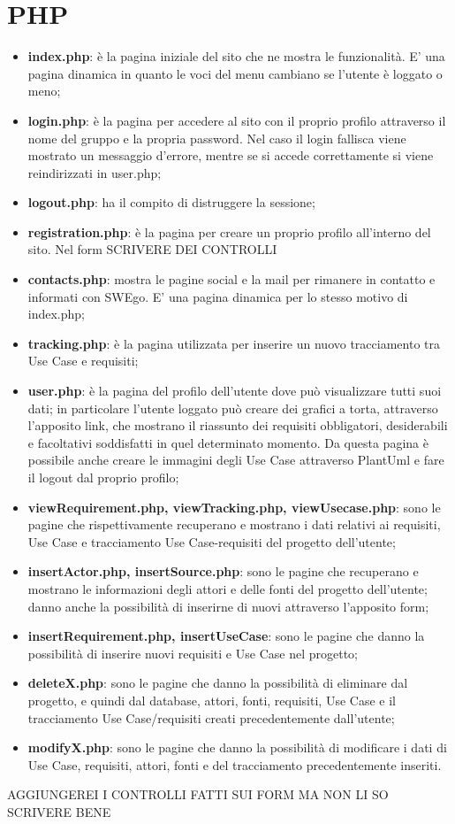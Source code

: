 \section{PHP}

\begin{itemize}
	\item \textbf{index.php}: è la pagina iniziale del sito che ne mostra le funzionalità. E' una pagina dinamica in quanto le voci del menu cambiano se l'utente è loggato o meno;
	\item \textbf{login.php}: è la pagina per accedere al sito con il proprio profilo attraverso il nome del gruppo e la propria password. Nel caso il login fallisca viene mostrato un messaggio d'errore, mentre se si accede correttamente si viene reindirizzati in user.php;
	\item \textbf{logout.php}: ha il compito di distruggere la sessione;
	\item \textbf{registration.php}: è la pagina per creare un proprio profilo all'interno del sito. Nel form SCRIVERE DEI CONTROLLI
	\item \textbf{contacts.php}: mostra le pagine social e la mail per rimanere in contatto e informati con SWEgo. E' una pagina dinamica per lo stesso motivo di index.php;
	\item \textbf{tracking.php}: è la pagina utilizzata per inserire un nuovo tracciamento tra Use Case e requisiti;
	\item \textbf{user.php}: è la pagina del profilo dell'utente dove può visualizzare tutti suoi dati; in particolare l'utente loggato può creare dei grafici a torta, attraverso l'apposito link, che mostrano il riassunto dei requisiti obbligatori, desiderabili e facoltativi soddisfatti in quel determinato momento. Da questa pagina è possibile anche creare le immagini degli Use Case attraverso PlantUml e fare il logout dal proprio profilo;
	\item \textbf{viewRequirement.php, viewTracking.php, viewUsecase.php}: sono le pagine che rispettivamente recuperano e mostrano i dati relativi ai requisiti, Use Case e tracciamento Use Case-requisiti del progetto dell'utente;
	\item \textbf{insertActor.php, insertSource.php}: sono le pagine che recuperano e mostrano le informazioni degli attori e delle fonti del progetto dell'utente; danno anche la possibilità di inserirne di nuovi attraverso l'apposito form;
	\item \textbf{insertRequirement.php, insertUseCase}: sono le pagine che danno la possibilità di inserire nuovi requisiti e Use Case nel progetto;
	\item \textbf{deleteX.php}: sono le pagine che danno la possibilità di eliminare dal progetto, e quindi dal database, attori, fonti, requisiti, Use Case e il tracciamento Use Case/requisiti creati precedentemente dall'utente; 
	\item \textbf{modifyX.php}: sono le pagine che danno la possibilità di modificare i dati di Use Case, requisiti, attori, fonti e del tracciamento precedentemente inseriti.
\end{itemize}

AGGIUNGEREI I CONTROLLI FATTI SUI FORM MA NON LI SO SCRIVERE BENE
